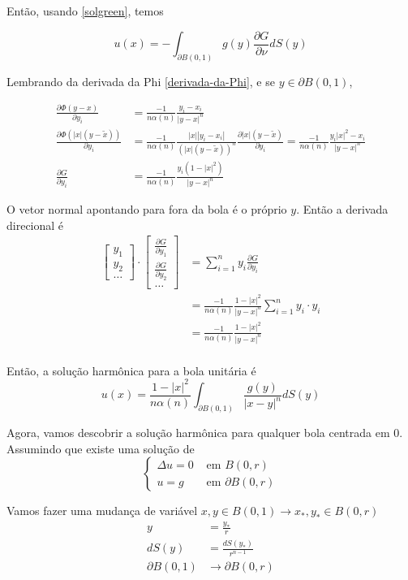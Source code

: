 \documentclass[11pt]{article}
\newcommand{\p}{\partial}
\newcommand{\pde}[2]{\frac{\p #1}{\p #2}}
\begin{document}
Então, usando \eqref{solgreen}, temos

\[u(x) = - \int_{\p B(0,1)} g(y) \pde{G}{\nu} dS(y)\]

Lembrando da derivada da Phi \eqref{derivada-da-Phi}, e se \(y \in \p B(0,1)\),

\begin{align*}
	\pde{\Phi(y-x)}{y_i} &= \frac{-1}{n \alpha(n)}\frac{y_i - x_i}{|y-x|^n} \\
	\pde{\Phi(|x|(y-\tilde{x}))}{y_i} &= \frac{-1}{n \alpha(n)} \frac{|x||y_i - x_i|}{(|x|(y-\tilde{x}))^n} \pde{|x|(y-\tilde{x})}{y_i}
	= \frac{-1}{n \alpha(n)} \frac{y_i |x|^2 - x_i}{|y-x|^n}\\
	\pde{G}{y_i} &= \frac{-1}{n \alpha(n)} \frac{y_i (1 - |x|^2)}{|y-x|^n}
\end{align*}

O vetor normal apontando para fora da bola é o próprio \(y\). Então a derivada direcional é 
\begin{align*}
	\begin{bmatrix} y_1 \\ 	y_2 \\ 	\ldots\end{bmatrix}\cdot
	\begin{bmatrix} \pde{G}{y_1} \\ \pde{G}{y_2} \\ \ldots \end{bmatrix}
	&= \sum_{i=1}^{n} y_i \pde{G}{y_i} \\
	&= \frac{-1}{n \alpha(n)} \frac{1- |x|^2}{|y-x|^n} \sum_{i=1}^{n} y_i \cdot y_i \\
	&= 	\frac{-1}{n \alpha(n)} \frac{1- |x|^2}{|y-x|^n} \\
\end{align*}

Então, a solução harmônica para a bola unitária é
\[ u(x) = \frac{1 - |x|^2}{n \alpha(n)} \int_{\p B(0,1)} \frac{g(y)}{|x-y|^n} dS(y) \]

Agora, vamos descobrir a solução harmônica para qualquer bola centrada em \(0\). Assumindo que existe uma solução de
\[\begin{cases}
	\Delta u = 0 & \text{ em } B(0,r) \\
	u = g & \text{ em } \p B(0,r)
\end{cases}\]

\newcommand{\newx}{x_*}\newcommand{\newy}{y_*}

Vamos fazer uma mudança de variável \(x,y \in B(0,1) \rightarrow \newx, \newy \in B(0,r)\)
\begin{align*}
	y &= \frac{y_*}{r} \\
	dS(y) &= \frac{dS(y_*)}{r^{n-1}} \\
	\p B(0,1) &\rightarrow \p B(0,r)
\end{align*}
\end{document}
